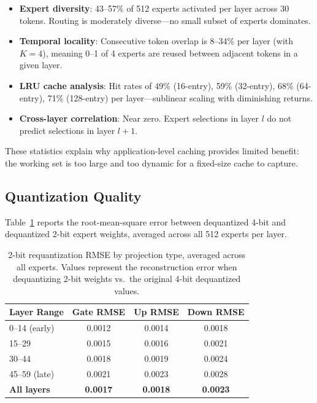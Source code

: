\documentclass[11pt,twocolumn]{article}
\begin{document}
\begin{itemize}[leftmargin=*,itemsep=2pt]
    \item \textbf{Expert diversity}: 43--57\% of 512 experts activated per layer across 30 tokens. Routing is moderately diverse---no small subset of experts dominates.
    \item \textbf{Temporal locality}: Consecutive token overlap is 8--34\% per layer (with $K=4$), meaning 0--1 of 4 experts are reused between adjacent tokens in a given layer.
    \item \textbf{LRU cache analysis}: Hit rates of 49\% (16-entry), 59\% (32-entry), 68\% (64-entry), 71\% (128-entry) per layer---sublinear scaling with diminishing returns.
    \item \textbf{Cross-layer correlation}: Near zero. Expert selections in layer $l$ do not predict selections in layer $l+1$.
\end{itemize}

These statistics explain why application-level caching provides limited benefit: the working set is too large and too dynamic for a fixed-size cache to capture.

\subsection{Quantization Quality}
\label{sec:quality}

Table~\ref{tab:rmse} reports the root-mean-square error between dequantized 4-bit and dequantized 2-bit expert weights, averaged across all 512 experts per layer.

\begin{table}[h!]
\centering
\small
\caption{2-bit requantization RMSE by projection type, averaged across all experts. Values represent the reconstruction error when dequantizing 2-bit weights vs.\ the original 4-bit dequantized values.}
\label{tab:rmse}
\begin{tabular}{@{}lccc@{}}
\toprule
\textbf{Layer Range} & \textbf{Gate RMSE} & \textbf{Up RMSE} & \textbf{Down RMSE} \\
\midrule
0--14 (early) & 0.0012 & 0.0014 & 0.0018 \\
15--29 & 0.0015 & 0.0016 & 0.0021 \\
30--44 & 0.0018 & 0.0019 & 0.0024 \\
45--59 (late) & 0.0021 & 0.0023 & 0.0028 \\
\midrule
\textbf{All layers} & \textbf{0.0017} & \textbf{0.0018} & \textbf{0.0023} \\
\bottomrule
\end{tabular}
\end{table}
\end{document}
